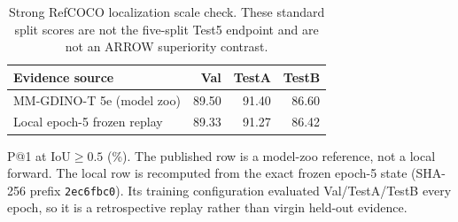 \begin{table}[t]
\centering
\caption{Strong RefCOCO localization scale check. These standard split
scores are not the five-split Test5 endpoint and are not an ARROW superiority
contrast.}
\label{tab:supp-strong-baseline}
\scriptsize
\setlength{\tabcolsep}{4.2pt}
\begin{tabular}{lrrr}\toprule
Evidence source & Val & TestA & TestB\\\midrule
MM-GDINO-T 5e (model zoo) & 89.50 & 91.40 & 86.60 \\
Local epoch-5 frozen replay & 89.33 & 91.27 & 86.42 \\
\bottomrule\end{tabular}
\parbox{0.96\columnwidth}{\scriptsize P@1 at IoU$\geq0.5$ (\%). The
published row is a model-zoo reference, not a local forward. The local row is
recomputed from the exact frozen epoch-5 state (SHA-256 prefix
\texttt{2ec6fbc0}). Its training configuration evaluated Val/TestA/TestB
every epoch, so it is a retrospective replay rather than virgin held-out
evidence.}
\end{table}
